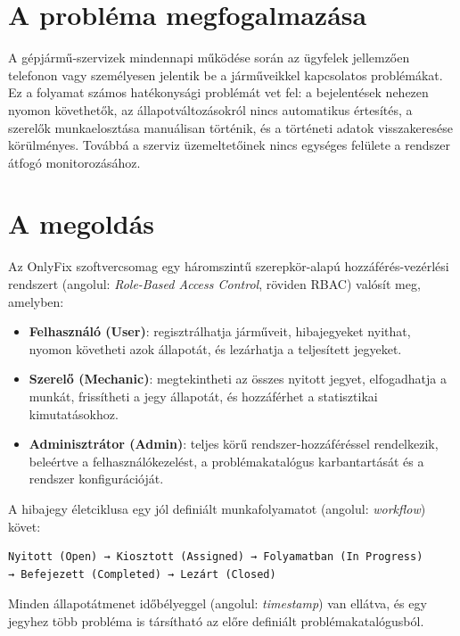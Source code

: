 \documentclass[colorlinks]{thesis-kando}
\begin{document}
\section{A probléma megfogalmazása}

A gépjármű-szervizek mindennapi működése során az ügyfelek jellemzően telefonon vagy személyesen jelentik be a járműveikkel kapcsolatos problémákat. Ez a folyamat számos hatékonysági problémát vet fel: a bejelentések nehezen nyomon követhetők, az állapotváltozásokról nincs automatikus értesítés, a szerelők munkaelosztása manuálisan történik, és a történeti adatok visszakeresése körülményes. Továbbá a szerviz üzemeltetőinek nincs egységes felülete a rendszer átfogó monitorozásához.

\section{A megoldás}

Az OnlyFix szoftvercsomag egy háromszintű szerepkör-alapú hozzáférés-vezérlési rendszert (angolul: \emph{Role-Based Access Control}, röviden RBAC) \cite{ref3} valósít meg, amelyben:

\begin{itemize}
\item \textbf{Felhasználó (User)}: regisztrálhatja járműveit, hibajegyeket nyithat, nyomon követheti azok állapotát, és lezárhatja a teljesített jegyeket.
\item \textbf{Szerelő (Mechanic)}: megtekintheti az összes nyitott jegyet, elfogadhatja a munkát, frissítheti a jegy állapotát, és hozzáférhet a statisztikai kimutatásokhoz.
\item \textbf{Adminisztrátor (Admin)}: teljes körű rendszer-hozzáféréssel rendelkezik, beleértve a felhasználókezelést, a problémakatalógus karbantartását és a rendszer konfigurációját.
\end{itemize}

A hibajegy életciklusa egy jól definiált munkafolyamatot (angolul: \emph{workflow}) követ:

\begin{verbatim}
Nyitott (Open) → Kiosztott (Assigned) → Folyamatban (In Progress)
→ Befejezett (Completed) → Lezárt (Closed)
\end{verbatim}

Minden állapotátmenet időbélyeggel (angolul: \emph{timestamp}) van ellátva, és egy jegyhez több probléma is társítható az előre definiált problémakatalógusból.

\end{document}
